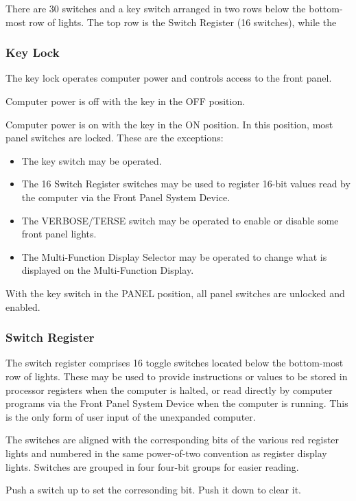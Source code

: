 \documentclass[11pt,a4paper,twocolumns]{article}
\newcommand{\sw}[1]{\textsf{#1}}
\begin{document}
There are 30 switches and a key switch arranged in two rows below the
bottom-most row of lights. The top row is the Switch Register (16
switches), while the 

\subsubsection{Key Lock}

The key lock operates computer power and controls access to the front
panel.

Computer power is off with the key in the \sw{OFF} position.

Computer power is on with the key in the \sw{ON} position. In this position,
most panel switches are locked. These are the exceptions:

\begin{itemize}
\item The key switch may be operated.
\item The 16 Switch Register switches may be used to register 16-bit values
  read by the computer via the Front Panel System Device.
\item The \sw{VERBOSE}/\sw{TERSE} switch may be operated to enable or disable
  some front panel lights.
\item The Multi-Function Display Selector may be operated to change what is
  displayed on the Multi-Function Display.
\end{itemize}

With the key switch in the \sw{PANEL} position, all panel switches are unlocked
and enabled.

\subsubsection{Switch Register}

The switch register comprises 16 toggle switches located below the bottom-most
row of lights. These may be used to provide instructions or values to be stored
in processor registers when the computer is halted, or read directly by
computer programs via the Front Panel System Device when the computer is
running. This is the only form of user input of the unexpanded computer.

The switches are aligned with the corresponding bits of the various red
register lights and numbered in the same power-of-two convention as register
display lights. Switches are grouped in four four-bit groups for easier
reading.

Push a switch up to set the corresonding bit. Push it down to clear it.
\end{document}
